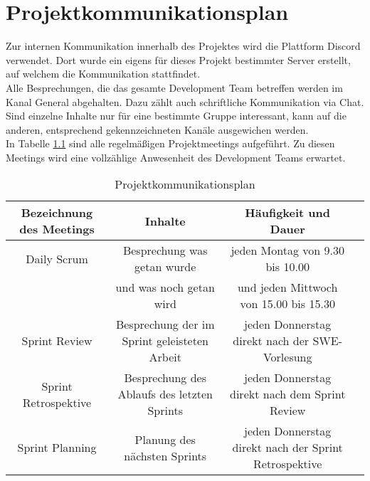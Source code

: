 \chapter{Projektkommunikationsplan}
Zur internen Kommunikation innerhalb des Projektes wird die Plattform Discord verwendet. Dort wurde ein eigens für dieses Projekt bestimmter Server erstellt, auf welchem die Kommunikation stattfindet. \\
Alle Besprechungen, die das gesamte Development Team betreffen werden im Kanal \glqq General\grqq\: abgehalten. Dazu zählt auch schriftliche Kommunikation via Chat. \\
Sind einzelne Inhalte nur für eine bestimmte Gruppe interessant, kann auf die anderen, entsprechend gekennzeichneten Kanäle ausgewichen werden. \\
In Tabelle \ref{tab:Kommunikation} sind alle regelmäßigen Projektmeetings aufgeführt. Zu diesen Meetings wird eine vollzählige Anwesenheit des Development Teams erwartet.

\begin{table}
\centering
\tiny
\begin{tabular} [h] {|c|c|c|c|}
\hline
Bezeichnung des Meetings & Inhalte & Häufigkeit und Dauer \\
\hline
Daily Scrum & Besprechung was getan wurde & jeden Montag von 9.30 bis 10.00\\
\quad & und was noch getan wird & und jeden Mittwoch von 15.00 bis 15.30 \\
\hline
Sprint Review & Besprechung der im Sprint geleisteten Arbeit & jeden Donnerstag direkt nach der SWE-Vorlesung\\
\hline
Sprint Retrospektive & Besprechung des Ablaufs des letzten Sprints & jeden Donnerstag direkt nach dem Sprint Review\\
\hline
Sprint Planning & Planung des nächsten Sprints & jeden Donnerstag direkt nach der Sprint Retrospektive\\
\hline
\end{tabular}
\caption{Projektkommunikationsplan}
\label{tab:Kommunikation}
\end{table}
